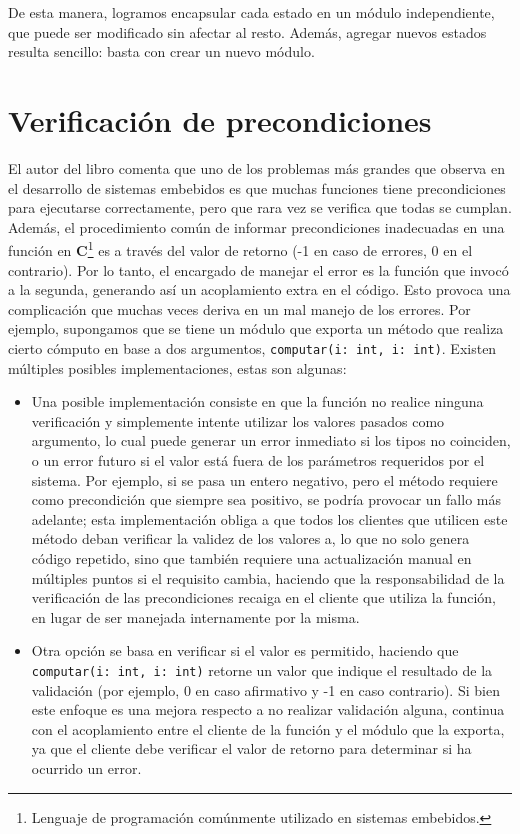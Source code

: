 De esta manera, logramos encapsular cada estado en un módulo independiente, que puede ser modificado sin afectar al resto. Además, agregar nuevos estados resulta sencillo: basta con crear un nuevo módulo.



\section{Verificación de precondiciones}
El autor del libro \cite{douglass} comenta que uno de los problemas más grandes que observa en el desarrollo de sistemas embebidos es que muchas funciones tiene precondiciones para ejecutarse correctamente, pero que rara vez se verifica que todas se cumplan. Además, el procedimiento común de informar precondiciones inadecuadas en una función en \textbf{C}\footnote{Lenguaje de programación comúnmente utilizado en sistemas embebidos.} es a través del valor de retorno (-1 en caso de errores, 0 en el contrario). Por lo tanto, el encargado de manejar el error es la función que invocó a la segunda, generando así un acoplamiento extra en el código. Esto provoca una complicación que muchas veces deriva en un mal manejo de los errores. Por ejemplo, supongamos que se tiene un módulo que exporta un método que realiza cierto cómputo en base a dos argumentos, \verb|computar(i: int, i: int)|. Existen múltiples posibles implementaciones, estas son algunas:
\begin{itemize}
    \item Una posible implementación consiste en que la función no realice ninguna verificación y simplemente intente utilizar los valores pasados como argumento, lo cual puede generar un error inmediato si los tipos no coinciden, o un error futuro si el valor está fuera de los parámetros requeridos por el sistema. Por ejemplo, si se pasa un entero negativo, pero el método requiere como precondición que siempre sea positivo, se podría provocar un fallo más adelante; esta implementación obliga a que todos los clientes que utilicen este método deban verificar la validez de los valores a, lo que no solo genera código repetido, sino que también requiere una actualización manual en múltiples puntos si el requisito cambia, haciendo que la responsabilidad de la verificación de las precondiciones recaiga en el cliente que utiliza la función, en lugar de ser manejada internamente por la misma.
    \item Otra opción se basa en verificar si el valor es permitido, haciendo que \\ \verb|computar(i: int, i: int)| retorne un valor que indique el resultado de la validación (por ejemplo, 0 en caso afirmativo y -1 en caso contrario). Si bien este enfoque es una mejora respecto a no realizar validación alguna, continua con el acoplamiento entre el cliente de la función y el módulo que la exporta, ya que el cliente debe verificar el valor de retorno para determinar si ha ocurrido un error.
\end{itemize}


